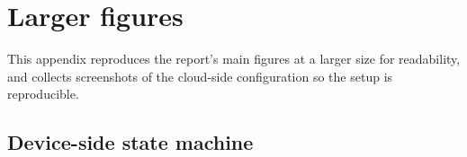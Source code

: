 \documentclass{article}
\begin{document}
\fi

\section{Larger figures}
\label{sec:appendix-figures}

This appendix reproduces the report's main figures at a larger size for readability, and collects screenshots of the cloud-side configuration so the setup is reproducible.

\newcommand{\tbdimg}[2]{%
    \fbox{\parbox[c][6cm][c]{0.9\textwidth}{\centering\itshape TODO: add screenshot -- #1\\[2pt]\small(save to \texttt{images/screenshots/#2})}}%
}

\subsection*{Device-side state machine}
\end{document}

